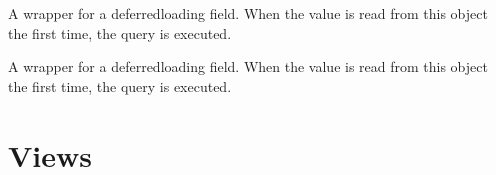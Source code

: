 \documentclass[letterpaper,10pt,english,openany,oneside]{sphinxmanual}
\begin{document}
\begin{fulllineitems}
\begin{fulllineitems}
\label{\detokenize{modules/models:users.models.userdata.id}}
A wrapper for a deferred\sphinxhyphen{}loading field. When the value is read from this
object the first time, the query is executed.

\end{fulllineitems}


\begin{fulllineitems}
\label{\detokenize{modules/models:users.models.userdata.name}}
A wrapper for a deferred\sphinxhyphen{}loading field. When the value is read from this
object the first time, the query is executed.

\end{fulllineitems}


\begin{fulllineitems}
\label{\detokenize{modules/models:users.models.userdata.objects}}
\end{fulllineitems}


\end{fulllineitems}



\chapter{Views}
\label{\detokenize{modules/views:module-users.views}}\label{\detokenize{modules/views:views}}\label{\detokenize{modules/views::doc}}
\end{document}
